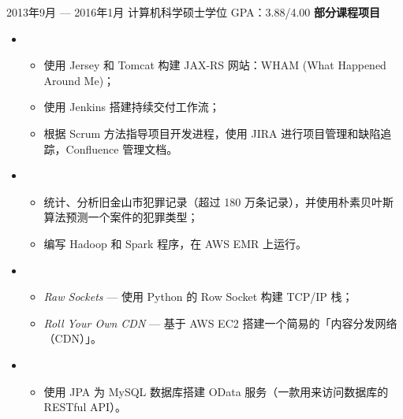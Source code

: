 \documentclass{resume}
\begin{document}
\smallskip


\begin{body}
	{2013年9月 --- 2016年1月}
	{计算机科学硕士学位}
	{GPA：3.88/4.00}
	\textbf{部分课程项目}
	\begin{itemize}
	\item {}
	\begin{itemize}
		\item 使用 Jersey 和 Tomcat 构建 JAX-RS 网站：WHAM (What Happened Around Me)；
		\item 使用 Jenkins 搭建持续交付工作流；
		\item 根据 Scrum 方法指导项目开发进程，使用 JIRA 进行项目管理和缺陷追踪，Confluence 管理文档。
	\end{itemize}

	\item {}
	\begin{itemize}
		\item 统计、分析旧金山市犯罪记录（超过 180 万条记录），并使用朴素贝叶斯算法预测一个案件的犯罪类型；
		\item 编写 Hadoop 和 Spark 程序，在 AWS EMR 上运行。
	\end{itemize}

	\item {}
	\begin{itemize}
		\item \textit{Raw Sockets} --- 使用 Python 的 Row Socket 构建 TCP/IP 栈；
		\item \textit{Roll Your Own CDN} --- 基于 AWS EC2 搭建一个简易的「内容分发网络（CDN）」。
	\end{itemize}

	\item {}
	\begin{itemize}
		\item 使用 JPA 为 MySQL 数据库搭建 OData 服务（一款用来访问数据库的 RESTful API）。
	\end{itemize}


\end{itemize}
\end{body}
\end{document}
